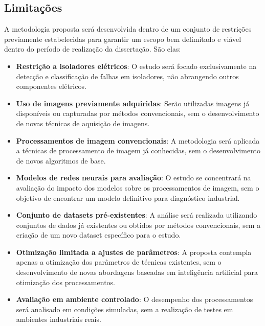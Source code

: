 \subsection{Limitações}

A metodologia proposta será desenvolvida dentro de um conjunto de restrições previamente estabelecidas para garantir um escopo bem delimitado e viável dentro do período de realização da dissertação. São elas:

\begin{itemize}
    \item \textbf{Restrição a isoladores elétricos}: O estudo será focado exclusivamente na detecção e classificação de falhas em isoladores, não abrangendo outros componentes elétricos.
    \item \textbf{Uso de imagens previamente adquiridas}: Serão utilizadas imagens já disponíveis ou capturadas por métodos convencionais, sem o desenvolvimento de novas técnicas de aquisição de imagens.
    \item \textbf{Processamentos de imagem convencionais}: A metodologia será aplicada a técnicas de processamento de imagem já conhecidas, sem o desenvolvimento de novos algoritmos de base.
    \item \textbf{Modelos de redes neurais para avaliação}: O estudo se concentrará na avaliação do impacto dos modelos sobre os processamentos de imagem, sem o objetivo de encontrar um modelo definitivo para diagnóstico industrial.
    \item \textbf{Conjunto de datasets pré-existentes}: A análise será realizada utilizando conjuntos de dados já existentes ou obtidos por métodos convencionais, sem a criação de um novo dataset específico para o estudo.
    \item \textbf{Otimização limitada a ajustes de parâmetros}: A proposta contempla apenas a otimização dos parâmetros de técnicas existentes, sem o desenvolvimento de novas abordagens baseadas em inteligência artificial para otimização dos processamentos.
    \item \textbf{Avaliação em ambiente controlado}: O desempenho dos processamentos será analisado em condições simuladas, sem a realização de testes em ambientes industriais reais.
\end{itemize}